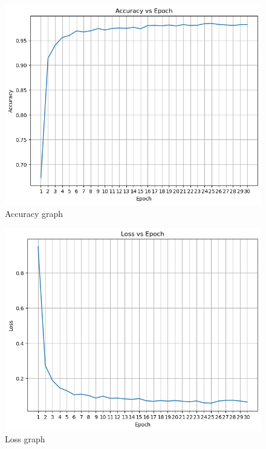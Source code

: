 \documentclass[conference]{IEEEtran}
\begin{document}
\begin{figure}[htbp]
\centerline{\includegraphics[scale=0.4]{assets/result-input/accuracy-over-epoch.png}}
\caption{Accuracy graph}
\label{accuracy}
\end{figure}

\begin{figure}[htbp]
\centerline{\includegraphics[scale=0.4]{assets/result-input/loss-over-epoch.png}}
\caption{Loss graph}
\label{loss_function}
\end{figure}
\end{document}
